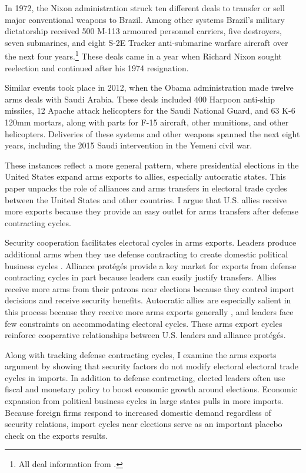 \documentclass[12pt]{article}
\begin{document}
In 1972, the Nixon administration struck ten different deals to transfer or sell major conventional weapons to Brazil.
Among other systems Brazil's military dictatorship received 500 M-113 armoured personnel carriers, five destroyers, seven submarines, and eight S-2E Tracker anti-submarine warfare aircraft over the next four years.\footnote{All deal information from \citep{Sipri2022}.}
These deals came in a year when Richard Nixon sought reelection and continued after his 1974 resignation. 


% 
Similar events took place in 2012, when the Obama administration made twelve arms deals with Saudi Arabia. 
These deals included 400 Harpoon anti-ship missiles, 12 Apache attack helicopters for the Saudi National Guard, and 63 K-6 120mm mortars, along with parts for F-15 aircraft, other munitions, and other helicopters. 
Deliveries of these systems and other weapons spanned the next eight years, including the 2015 Saudi intervention in the Yemeni civil war. 





These instances reflect a more general pattern, where presidential elections in the United States expand arms exports to allies, especially autocratic states.
This paper unpacks the role of alliances and arms transfers in electoral trade cycles between the United States and other countries. 
I argue that U.S. allies receive more exports because they provide an easy outlet for arms transfers after defense contracting cycles. 


Security cooperation facilitates electoral cycles in arms exports. 
Leaders produce additional arms when they use defense contracting to create domestic political business cycles \citep{Tufte1978, Mintz1988, Mayer1995, DerouenHeo2000, Becker2021}.
Alliance prot{\'e}g{\'e}s provide a key market for exports from defense contracting cycles in part because leaders can easily justify transfers. 
Allies receive more arms from their patrons near elections because they control import decisions and receive security benefits. 
Autocratic allies are especially salient in this process because they receive more arms exports generally \citep{McManusYarhi-Milo2017}, and leaders face few constraints on accommodating electoral cycles.
These arms export cycles reinforce cooperative relationships between U.S. leaders and alliance prot{\'e}g{\'e}s.


Along with tracking defense contracting cycles, I examine the arms exports argument by showing that security factors do not modify electoral electoral trade cycles in imports.
In addition to defense contracting, elected leaders often use fiscal and monetary policy \citep{Nordhaus1975, Tufte1978, Rogoff1987, ClarkHallerberg2000} to boost economic growth around elections. 
Economic expansion from political business cycles in large states pulls in more imports.
Because foreign firms respond to increased domestic demand regardless of security relations, import cycles near elections serve as an important placebo check on the exports results.
\end{document}
